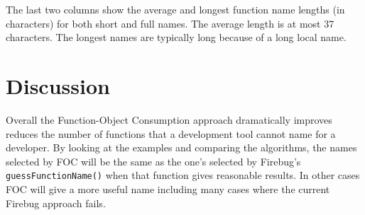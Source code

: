 \documentclass[10pt, preprint]{sigplanconf}
\begin{document}
The last two columns show the average and longest function name lengths (in characters) for both short and full names. The average length is at most 37 characters. The longest  names are typically long because of a long local name.  



   

\section{Discussion}
Overall the Function-Object Consumption approach dramatically improves reduces the number of functions that a development tool cannot name for a developer.  By looking at the examples and comparing the algorithms, the names selected by FOC will be the same as the one's selected by  Firebug's {\small \texttt{guessFunctionName()}} when that function gives reasonable results. In other cases FOC will give a more useful name including many cases where the current Firebug approach fails. 
\end{document}
